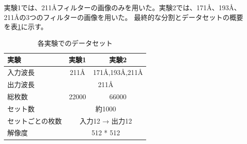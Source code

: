 実験1では、211Åフィルターの画像のみを用いた。実験2では、171Å、193Å、211Åの3つのフィルターの画像を用いた。
最終的な分割とデータセットの概要を表\ref{tab:dataset}に示す。

\begin{table}[h]
    \centering
    \begin{tabular}{l|c|c}
    \hline
    実験 & 実験1 & 実験2 \\
    \hline\hline
    入力波長 & 211Å & 171Å,193Å,211Å \\
    \hline
    出力波長 & \multicolumn{2}{c}{211Å} \\
    \hline
    総枚数 & 22000 & 66000 \\
    \hline
    セット数 & \multicolumn{2}{c}{約1000} \\
    \hline
    セットごとの枚数 & \multicolumn{2}{c}{入力12 → 出力12} \\
    \hline
    解像度 & \multicolumn{2}{c}{512 * 512} \\
    \hline
    \end{tabular}
    \caption{各実験でのデータセット}
    \label{tab:dataset}
\end{table}




